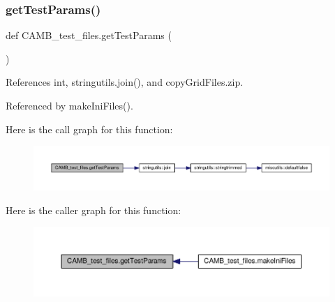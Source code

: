 \mbox{\label{namespaceCAMB__test__files_a58c704352d09b51b6422bbd028119e8f}} 
\subsubsection{\texorpdfstring{get\+Test\+Params()}{getTestParams()}}
{\footnotesize\ttfamily def C\+A\+M\+B\+\_\+test\+\_\+files.\+get\+Test\+Params (\begin{DoxyParamCaption}{ }\end{DoxyParamCaption})}



References int, stringutils.\+join(), and copy\+Grid\+Files.\+zip.



Referenced by make\+Ini\+Files().

Here is the call graph for this function\+:
\nopagebreak
\begin{figure}[H]
\begin{center}
\leavevmode
\includegraphics[width=350pt]{namespaceCAMB__test__files_a58c704352d09b51b6422bbd028119e8f_cgraph}
\end{center}
\end{figure}
Here is the caller graph for this function\+:
\nopagebreak
\begin{figure}[H]
\begin{center}
\leavevmode
\includegraphics[width=350pt]{namespaceCAMB__test__files_a58c704352d09b51b6422bbd028119e8f_icgraph}
\end{center}
\end{figure}
\mbox{\label{namespaceCAMB__test__files_ad8e40066d0c7e67c40c354153d790106}} 

